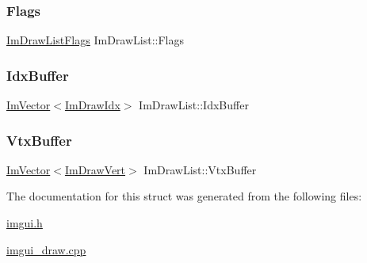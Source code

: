 \subsubsection{\texorpdfstring{Flags}{Flags}}
{\footnotesize\ttfamily \mbox{\hyperlink{imgui_8h_a1adb61806505bf501bb0fbcdf4414360}{Im\+Draw\+List\+Flags}} Im\+Draw\+List\+::\+Flags}

\mbox{\label{struct_im_draw_list_adf292ff70a954d82daf061c609e75dfc}} 
\subsubsection{\texorpdfstring{Idx\+Buffer}{IdxBuffer}}
{\footnotesize\ttfamily \mbox{\hyperlink{class_im_vector}{Im\+Vector}}$<$\mbox{\hyperlink{imgui_8h_afdc8744a5ac1a968b1ddfa47e13b2fa1}{Im\+Draw\+Idx}}$>$ Im\+Draw\+List\+::\+Idx\+Buffer}

\mbox{\label{struct_im_draw_list_aa8ff4aee39cf3c3791b7e29a7b4264be}} 
\subsubsection{\texorpdfstring{Vtx\+Buffer}{VtxBuffer}}
{\footnotesize\ttfamily \mbox{\hyperlink{class_im_vector}{Im\+Vector}}$<$\mbox{\hyperlink{struct_im_draw_vert}{Im\+Draw\+Vert}}$>$ Im\+Draw\+List\+::\+Vtx\+Buffer}



The documentation for this struct was generated from the following files\+:\begin{DoxyCompactItemize}
\item 
\mbox{\hyperlink{imgui_8h}{imgui.\+h}}\item 
\mbox{\hyperlink{imgui__draw_8cpp}{imgui\+\_\+draw.\+cpp}}\end{DoxyCompactItemize}
